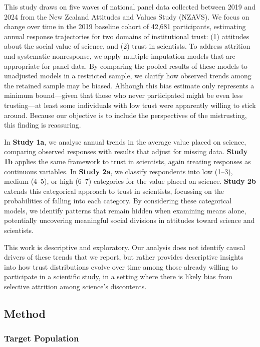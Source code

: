 \documentclass[
  single column]{article}
\begin{document}
This study draws on five waves of national panel data collected between
2019 and 2024 from the New Zealand Attitudes and Values Study (NZAVS).
We focus on change over time in the 2019 baseline cohort of 42,681
participants, estimating annual response trajectories for two domains of
institutional trust: (1) attitudes about the social value of science,
and (2) trust in scientists. To address attrition and systematic
nonresponse, we apply multiple imputation models that are appropriate
for panel data. By comparing the pooled results of these models to
unadjusted models in a restricted sample, we clarify how observed trends
among the retained sample may be biased. Although this bias estimate
only represents a minimum bound---given that those who never
participated might be even less trusting---at least some individuals
with low trust were apparently willing to stick around. Because our
objective is to include the perspectives of the mistrusting, this
finding is reassuring.

In \textbf{Study 1a}, we analyse annual trends in the average value
placed on science, comparing observed responses with results that adjust
for missing data. \textbf{Study 1b} applies the same framework to trust
in scientists, again treating responses as continuous variables. In
\textbf{Study 2a}, we classify respondents into low (1--3), medium
(4--5), or high (6--7) categories for the value placed on science.
\textbf{Study 2b} extends this categorical approach to trust in
scientists, focussing on the probabilities of falling into each
category. By considering these categorical models, we identify patterns
that remain hidden when examining means alone, potentially uncovering
meaningful social divisions in attitudes toward science and scientists.

This work is descriptive and exploratory. Our analysis does not identify
causal drivers of these trends that we report, but rather provides
descriptive insights into how trust distributions evolve over time among
those already willing to participate in a scientific study, in a setting
where there is likely bias from selective attrition among science's
discontents.

\subsection{Method}\label{method}

\subsubsection{Target Population}\label{target-population}
\end{document}
